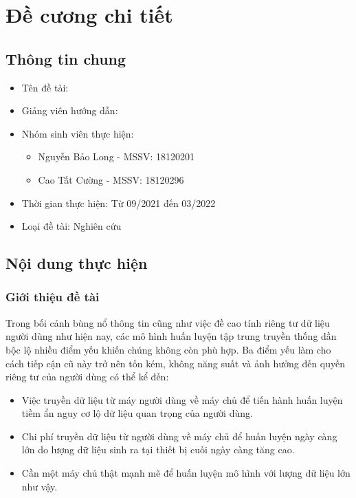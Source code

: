 \chapter*{Đề cương chi tiết}
\label{proposal}

\section*{Thông tin chung}

\begin{itemize}
    \item Tên đề tài: \tenKL
    \item Giảng viên hướng dẫn: \tenGVHD
    \item Nhóm sinh viên thực hiện:
    \begin{itemize}
        \item Nguyễn Bảo Long - MSSV: 18120201
        \item Cao Tất Cường - MSSV: 18120296
    \end{itemize}

    \item Thời gian thực hiện: Từ 09/2021 đến 03/2022
    \item Loại đề tài: Nghiên cứu
\end{itemize}

\section*{Nội dung thực hiện}

\subsection*{Giới thiệu đề tài}

Trong bối cảnh bùng nổ thông tin cũng như việc đề cao tính riêng tư dữ liệu người dùng như hiện nay, các mô hình huấn luyện tập trung truyền thống dần bộc lộ nhiều điểm yếu khiến chúng không còn phù hợp. Ba điểm yếu làm cho cách tiếp cận cũ này trở nên tốn kém, không năng suất và ảnh hưởng đến quyền riêng tư của người dùng có thể kể đến:

\begin{itemize}
    \item Việc truyền dữ liệu từ máy người dùng về máy chủ để tiến hành huấn luyện tiềm ẩn nguy cơ lộ dữ liệu quan trọng của người dùng.
    \item Chi phí truyền dữ liệu từ người dùng về máy chủ để huấn luyện ngày càng lớn do lượng dữ liệu sinh ra tại thiết bị cuối ngày càng tăng cao.
    \item Cần một máy chủ thật mạnh mẽ để huấn luyện mô hình với lượng dữ liệu lớn như vậy.
\end{itemize}

